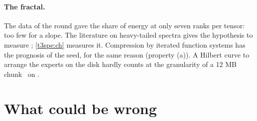 \paragraph{The fractal.} The data of the round gave the share of energy at only seven ranks per tensor: too few for a slope. The literature on heavy-tailed spectra \parencite{martin2018implicit} gives the hypothesis to measure \litt; \cref{t3spe:ch} measures it. Compression by iterated function systems has the prognosis of the seed, for the same reason (property (a)). A Hilbert curve to arrange the experts on the disk hardly counts at the granularity of a 12 MB chunk \calc~on \mes.

\section{What could be wrong}\label{t3syn:sec:faux}

